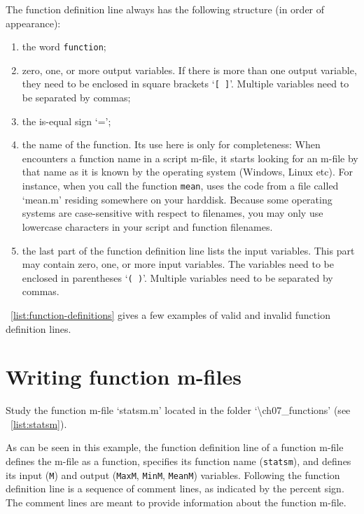 \vspace{1em}
\noindent The function definition line always has the following structure (in order of appearance):
\begin{enumerate}
\item{the word {\tt function};}
\item{zero, one, or more output variables. If there is more than one output variable, they need to be enclosed in square brackets `{\tt [ ]}'. Multiple variables need to be separated by commas;}
\item{the is-equal sign `=';}
\item{the name of the function. Its use here is only for completeness: When \MATLAB{} encounters a function name in a script m-file, it starts looking for an m-file by that name as it is known by the operating system (Windows, Linux etc). For instance, when you call the function {\tt mean}, \MATLAB{} uses the code from a file called `mean.m' residing somewhere on your harddisk. Because some operating systems are case-sensitive with respect to filenames, you may only use lowercase characters in your script and function filenames.}
\item{the last part of the function definition line lists the input variables. This part may contain zero, one, or more input variables. The variables need to be enclosed in parentheses `{\tt ( )}'. Multiple variables need to be separated by commas.}
\end{enumerate}
\lstlistingname{}~\ref{list:function-definitions} gives a few examples of valid and invalid function definition lines.






\section{Writing function m-files}

\begin{action}
Study the function m-file `statsm.m' located in the folder `\textbackslash{}ch07\_functions' (see \lstlistingname{}~\ref{list:statsm}).
\end{action}

As can be seen in this example, the function definition line of a function m-file defines the m-file as a function, specifies its function name ({\tt statsm}), and defines its input ({\tt M}) and output ({\tt MaxM}, {\tt MinM}, {\tt MeanM}) variables. Following the function definition line is a sequence of comment lines, as indicated by the percent sign. The comment lines are meant to provide information about the function m-file. 


